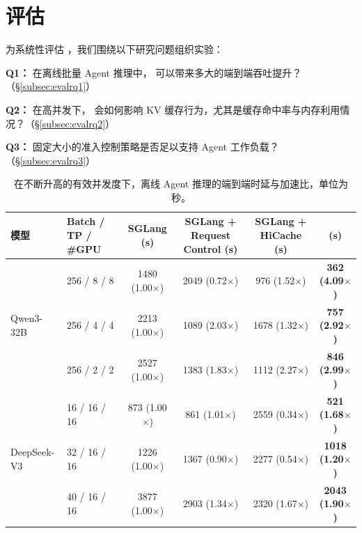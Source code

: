 \section{评估}

为系统性评估 \SysName{}，我们围绕以下研究问题组织实验：

\noindent \textbf{Q1：} 在离线批量 Agent 推理中，\SysName{} 可以带来多大的端到端吞吐提升？（\S\ref{subsec:evalrq1}）

\noindent \textbf{Q2：} 在高并发下，\SysName{} 会如何影响 KV 缓存行为，尤其是缓存命中率与内存利用情况？（\S\ref{subsec:evalrq2}）

\noindent \textbf{Q3：} 固定大小的准入控制策略是否足以支持 Agent 工作负载？（\S\ref{subsec:evalrq3}）

\begin{table}[t]
\caption{在不断升高的有效并发度下，离线 Agent 推理的端到端时延与加速比，单位为秒。}
\centering
\small
\begin{tabular}{l l c c c c}
\toprule
\textbf{模型} & \textbf{Batch / TP / \#GPU}
& \textbf{SGLang (s)}
& \textbf{SGLang + Request Control (s)}
& \textbf{SGLang + HiCache (s)}
& \textbf{\SysName{} (s)}\\
\midrule
& 256 / 8 / 8
& 1480 (1.00$\times$)
& 2049 (0.72$\times$)
& 976 (1.52$\times$)
& \textbf{362 (4.09$\times$)} \\

Qwen3-32B & 256 / 4 / 4
& 2213 (1.00$\times$)
& 1089 (2.03$\times$)
& 1678 (1.32$\times$)
& \textbf{757 (2.92$\times$)} \\

& 256 / 2 / 2
& 2527 (1.00$\times$)
& 1383 (1.83$\times$)
& 1112 (2.27$\times$)
& \textbf{846 (2.99$\times$)} \\

\midrule
& 16 / 16 / 16
& 873 (1.00$\times$)
& 861 (1.01$\times$)
& 2559 (0.34$\times$)
& \textbf{521 (1.68$\times$)} \\

DeepSeek-V3
& 32 / 16 / 16
& 1226 (1.00$\times$)
& 1367 (0.90$\times$)
& 2277 (0.54$\times$)
& \textbf{1018 (1.20$\times$)} \\

& 40 / 16 / 16
& 3877 (1.00$\times$)
& 2903 (1.34$\times$)
& 2320 (1.67$\times$)
& \textbf{2043 (1.90$\times$)} \\

\bottomrule
\end{tabular}

\label{tab:end_to_end_latency}
\end{table}

